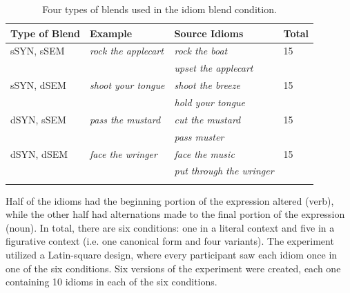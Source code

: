 \documentclass[output=paper,modfonts,nonflat]{langsci/langscibook}
\begin{document}
\begin{table}[h]
\begin{center}
\caption{\normalsize{Four types of blends used in the idiom blend condition.}}
\label{blendTypes}
\small{
\begin{tabular}{llll}
\lsptoprule
\bf{Type of Blend}&\textbf{Example}&\textbf{Source Idioms}&\textbf{Total}\\
\midrule
sSYN, sSEM&\textit{rock the applecart}&\textit{rock the boat}&15\\
&&\textit{upset the applecart}&\\
sSYN, dSEM&\textit{shoot your tongue}&\textit{shoot the breeze}&15\\
&&\textit{hold your tongue}&\\
dSYN, sSEM&\textit{pass the mustard}&\textit{cut the mustard}&15\\
&&\textit{pass muster}&\\
dSYN, dSEM&\textit{face the wringer}&\textit{face the music}&15\\
&&\textit{put through the wringer}&\\
\lspbottomrule
\end{tabular}
}
\end{center}
\end{table}


Half of the idioms had the beginning portion of the expression altered (verb), while the other half had alternations made to the final portion of the expression (noun). In total, there are six conditions: one in a literal context and five in a figurative context (i.e. one canonical form and four variants). The experiment utilized a Latin-square design, where every participant saw each idiom once in one of the six conditions. Six versions of the experiment were created, each one containing 10 idioms in each of the six conditions.\\
\end{document}
